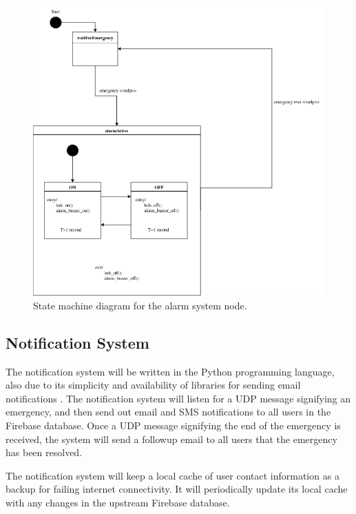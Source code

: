 \begin{figure}[H]
    \centering
    \includegraphics[width=\linewidth]{../assets/AlarmSystemStateMachine.png}
    \caption{State machine diagram for the alarm system node.}
\end{figure}

\subsection{Notification System}


The notification system will be written in the Python programming language, also due to its simplicity and availability
of libraries for sending email notifications \cite{python-email}. The notification system will listen for a UDP message
signifying an emergency, and then send out email and SMS notifications to all users in the Firebase database. Once a
UDP message signifying the end of the emergency is received, the system will send a followup email to all users that
the emergency has been resolved.

The notification system will keep a local cache of user contact information as a backup for failing internet
connectivity. It will periodically update its local cache with any changes in the upstream Firebase database.

